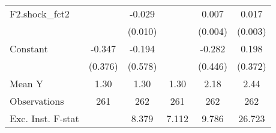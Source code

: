 {\begin{tabular}{l*{5}{c}}
\addlinespace
F2.shock\_fct2       &                     &      -0.029\sym{**} &                     &       0.007         &       0.017\sym{***}\\
                    &                     &     (0.010)         &                     &     (0.004)         &     (0.003)         \\
\addlinespace
Constant            &      -0.347         &      -0.194         &                     &      -0.282         &       0.198         \\
                    &     (0.376)         &     (0.578)         &                     &     (0.446)         &     (0.372)         \\
\midrule
Mean Y              &        1.30         &        1.30         &        1.30         &        2.18         &        2.44         \\
Observations        &         261         &         262         &         261         &         262         &         262         \\
Exc. Inst. F-stat   &                     &       8.379         &       7.112         &       9.786         &      26.723         \\
\bottomrule
\end{tabular}
}
